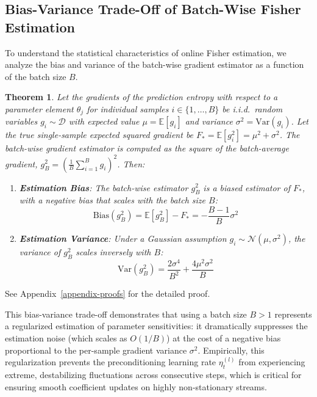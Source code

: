 \documentclass{article}
\theoremstyle{plain}
\newtheorem{theorem}{Theorem}[section]
\theoremstyle{definition}
\begin{document}
\subsection{Bias-Variance Trade-Off of Batch-Wise Fisher Estimation}
To understand the statistical characteristics of online Fisher estimation, we analyze the bias and variance of the batch-wise gradient estimator as a function of the batch size $B$.
\begin{theorem}
Let the gradients of the prediction entropy with respect to a parameter element $\theta_j$ for individual samples $i \in \{1,\dots,B\}$ be i.i.d.\ random variables $g_i \sim \mathcal{D}$ with expected value $\mu = \mathbb{E}[g_i]$ and variance $\sigma^2 = \text{Var}(g_i)$. Let the true single-sample expected squared gradient be $F_* = \mathbb{E}[g_i^2] = \mu^2 + \sigma^2$. The batch-wise gradient estimator is computed as the square of the batch-average gradient, $g_B^2 = \left( \frac{1}{B} \sum_{i=1}^B g_i \right)^2$.
Then:
\begin{enumerate}
    \item \textbf{Estimation Bias}: The batch-wise estimator $g_B^2$ is a biased estimator of $F_*$, with a negative bias that scales with the batch size $B$:
    \begin{equation}
        \text{Bias}(g_B^2) = \mathbb{E}[g_B^2] - F_* = - \frac{B - 1}{B} \sigma^2
    \end{equation}
    \item \textbf{Estimation Variance}: Under a Gaussian assumption $g_i \sim \mathcal{N}(\mu, \sigma^2)$, the variance of $g_B^2$ scales inversely with $B$:
    \begin{equation}
        \text{Var}(g_B^2) = \frac{2 \sigma^4}{B^2} + \frac{4 \mu^2 \sigma^2}{B}
    \end{equation}
\end{enumerate}
\end{theorem}
See Appendix~\ref{appendix-proofs} for the detailed proof.

This bias-variance trade-off demonstrates that using a batch size $B > 1$ represents a regularized estimation of parameter sensitivities: it dramatically suppresses the estimation noise (which scales as $O(1/B)$) at the cost of a negative bias proportional to the per-sample gradient variance $\sigma^2$. Empirically, this regularization prevents the preconditioning learning rate $\eta_t^{(l)}$ from experiencing extreme, destabilizing fluctuations across consecutive steps, which is critical for ensuring smooth coefficient updates on highly non-stationary streams.
\end{document}
